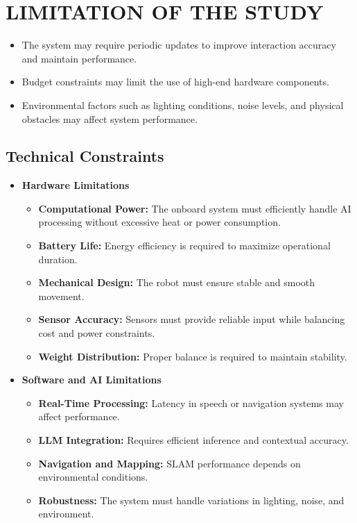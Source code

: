 \section{LIMITATION OF THE STUDY}

\begin{itemize}
\item The system may require periodic updates to improve interaction accuracy and maintain performance.
\item Budget constraints may limit the use of high-end hardware components.
\item Environmental factors such as lighting conditions, noise levels, and physical obstacles may affect system performance.
\end{itemize}

\subsection{Technical Constraints}

\begin{itemize}
\item \textbf{Hardware Limitations}
\begin{itemize}
\item \textbf{Computational Power:} The onboard system must efficiently handle AI processing without excessive heat or power consumption.
\item \textbf{Battery Life:} Energy efficiency is required to maximize operational duration.
\item \textbf{Mechanical Design:} The robot must ensure stable and smooth movement.
\item \textbf{Sensor Accuracy:} Sensors must provide reliable input while balancing cost and power constraints.
\item \textbf{Weight Distribution:} Proper balance is required to maintain stability.
\end{itemize}

\item \textbf{Software and AI Limitations}
\begin{itemize}
\item \textbf{Real-Time Processing:} Latency in speech or navigation systems may affect performance.
\item \textbf{LLM Integration:} Requires efficient inference and contextual accuracy.
\item \textbf{Navigation and Mapping:} SLAM performance depends on environmental conditions.
\item \textbf{Robustness:} The system must handle variations in lighting, noise, and environment.
\end{itemize}
\end{itemize}


